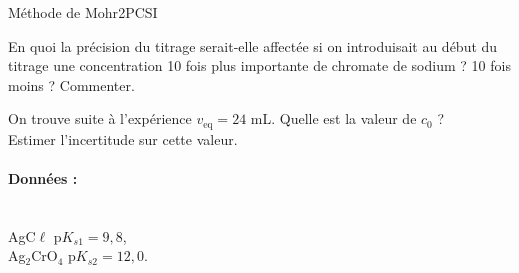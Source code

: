 \begin{exercise}{Méthode de Mohr}{2}{PCSI}
\begin{questions}
\question En quoi la précision du titrage serait-elle affectée si on introduisait au début du titrage une concentration 10 fois plus importante de chromate de sodium ? 10 fois moins ? Commenter.

\question On trouve suite à l'expérience $v_\text{eq} = 24$ mL. Quelle est la valeur de $c_0$ ? \\
Estimer l'incertitude sur cette valeur.

\end{questions}

\paragraph{Données : }~\\
AgC$\ell$ \quad p$K_{s1} = 9,8$, \\
Ag$_2$CrO$_4$ \quad p$K_{s2} = 12,0$.


\end{exercise}

\newpage

